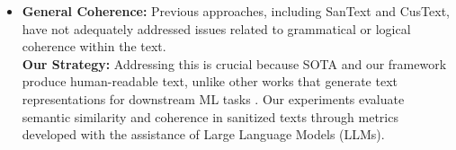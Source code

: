 \documentclass[11pt]{article}
\newcommand{\clusant}{CluSanT\xspace}
\begin{document}
\begin{itemize}
    \item \textbf{General Coherence:} Previous approaches, including SanText and CusText, have not adequately addressed issues related to grammatical or logical coherence within the text. \\ 
    \textbf{Our Strategy:} Addressing this is crucial because SOTA and our framework produce human-readable text, unlike other works that generate text representations for downstream ML tasks \cite{feyisetan2019leveraging, feyisetan2020privacy, lyu2020differentially, lyu2020towards}. Our experiments evaluate semantic similarity and coherence in sanitized texts through metrics developed with the assistance of Large Language Models (LLMs). 
\end{itemize}




\end{document}
